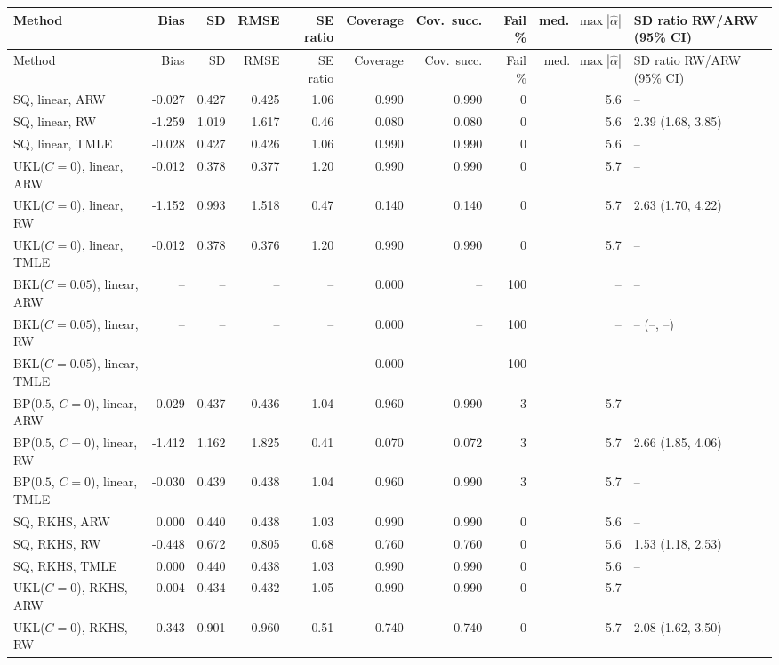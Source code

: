 \begin{tabular}{lrrrrrrrrl}
\hline
Method & Bias & SD & RMSE & SE ratio & Coverage & Cov.\ succ. & Fail \% & med.\ $\max|\widehat\alpha|$ & SD ratio RW/ARW (95\% CI) \\
\hline
\endfirsthead
\hline
Method & Bias & SD & RMSE & SE ratio & Coverage & Cov.\ succ. & Fail \% & med.\ $\max|\widehat\alpha|$ & SD ratio RW/ARW (95\% CI) \\
\hline
\endhead
SQ, linear, ARW & -0.027 & 0.427 & 0.425 & 1.06 & 0.990 & 0.990 & 0 & 5.6 & -- \\
SQ, linear, RW & -1.259 & 1.019 & 1.617 & 0.46 & 0.080 & 0.080 & 0 & 5.6 & 2.39 (1.68, 3.85) \\
SQ, linear, TMLE & -0.028 & 0.427 & 0.426 & 1.06 & 0.990 & 0.990 & 0 & 5.6 & -- \\
UKL($C=0$), linear, ARW & -0.012 & 0.378 & 0.377 & 1.20 & 0.990 & 0.990 & 0 & 5.7 & -- \\
UKL($C=0$), linear, RW & -1.152 & 0.993 & 1.518 & 0.47 & 0.140 & 0.140 & 0 & 5.7 & 2.63 (1.70, 4.22) \\
UKL($C=0$), linear, TMLE & -0.012 & 0.378 & 0.376 & 1.20 & 0.990 & 0.990 & 0 & 5.7 & -- \\
BKL($C=0.05$), linear, ARW & -- & -- & -- & -- & 0.000 & -- & 100 & -- & -- \\
BKL($C=0.05$), linear, RW & -- & -- & -- & -- & 0.000 & -- & 100 & -- & -- (--, --) \\
BKL($C=0.05$), linear, TMLE & -- & -- & -- & -- & 0.000 & -- & 100 & -- & -- \\
BP($0.5$, $C=0$), linear, ARW & -0.029 & 0.437 & 0.436 & 1.04 & 0.960 & 0.990 & 3 & 5.7 & -- \\
BP($0.5$, $C=0$), linear, RW & -1.412 & 1.162 & 1.825 & 0.41 & 0.070 & 0.072 & 3 & 5.7 & 2.66 (1.85, 4.06) \\
BP($0.5$, $C=0$), linear, TMLE & -0.030 & 0.439 & 0.438 & 1.04 & 0.960 & 0.990 & 3 & 5.7 & -- \\
SQ, RKHS, ARW & 0.000 & 0.440 & 0.438 & 1.03 & 0.990 & 0.990 & 0 & 5.6 & -- \\
SQ, RKHS, RW & -0.448 & 0.672 & 0.805 & 0.68 & 0.760 & 0.760 & 0 & 5.6 & 1.53 (1.18, 2.53) \\
SQ, RKHS, TMLE & 0.000 & 0.440 & 0.438 & 1.03 & 0.990 & 0.990 & 0 & 5.6 & -- \\
UKL($C=0$), RKHS, ARW & 0.004 & 0.434 & 0.432 & 1.05 & 0.990 & 0.990 & 0 & 5.7 & -- \\
UKL($C=0$), RKHS, RW & -0.343 & 0.901 & 0.960 & 0.51 & 0.740 & 0.740 & 0 & 5.7 & 2.08 (1.62, 3.50) \\

\end{tabular}
